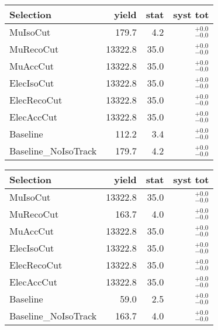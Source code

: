 
\begin{tabular}{l|rrr}
\toprule
              Selection & yield & stat & syst tot   \\ 
\midrule
               MuIsoCut & 179.7 & 4.2 & ${}^{+0.0}_{-0.0}$ \\
              MuRecoCut & 13322.8 & 35.0 & ${}^{+0.0}_{-0.0}$ \\
               MuAccCut & 13322.8 & 35.0 & ${}^{+0.0}_{-0.0}$ \\
             ElecIsoCut & 13322.8 & 35.0 & ${}^{+0.0}_{-0.0}$ \\
            ElecRecoCut & 13322.8 & 35.0 & ${}^{+0.0}_{-0.0}$ \\
             ElecAccCut & 13322.8 & 35.0 & ${}^{+0.0}_{-0.0}$ \\
               Baseline & 112.2 & 3.4 & ${}^{+0.0}_{-0.0}$ \\
   Baseline\_NoIsoTrack & 179.7 & 4.2 & ${}^{+0.0}_{-0.0}$ \\
\bottomrule
\end{tabular}



\begin{tabular}{l|rrr}
\toprule
              Selection & yield & stat & syst tot   \\ 
\midrule
               MuIsoCut & 13322.8 & 35.0 & ${}^{+0.0}_{-0.0}$ \\
              MuRecoCut & 163.7 & 4.0 & ${}^{+0.0}_{-0.0}$ \\
               MuAccCut & 13322.8 & 35.0 & ${}^{+0.0}_{-0.0}$ \\
             ElecIsoCut & 13322.8 & 35.0 & ${}^{+0.0}_{-0.0}$ \\
            ElecRecoCut & 13322.8 & 35.0 & ${}^{+0.0}_{-0.0}$ \\
             ElecAccCut & 13322.8 & 35.0 & ${}^{+0.0}_{-0.0}$ \\
               Baseline & 59.0 & 2.5 & ${}^{+0.0}_{-0.0}$ \\
   Baseline\_NoIsoTrack & 163.7 & 4.0 & ${}^{+0.0}_{-0.0}$ \\
\bottomrule
\end{tabular}
